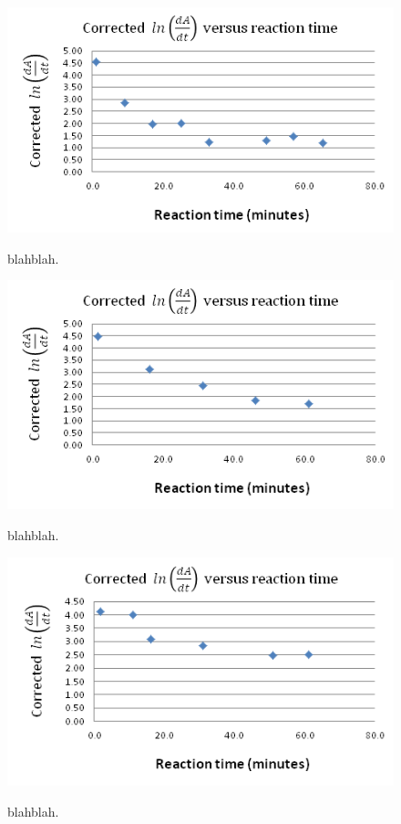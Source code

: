 \begin{figure}[h]
  \includegraphics[scale=0.5]{./Figures/10M_dipic_readings.png}\\
  \caption{blahblah.}\label{fig:0.10M_dipic_readings}
\end{figure}

\begin{figure}[h]
  \includegraphics[scale=0.5]{./Figures/05M_dipic_readings.png}\\
  \caption{blahblah.}\label{fig:0.05M_dipic_readings}
\end{figure}

\begin{figure}[h]
  \includegraphics[scale=0.5]{./Figures/032M_dipic_readings.png}\\
  \caption{blahblah.}\label{fig:0.032M_dipic_readings}
\end{figure}

